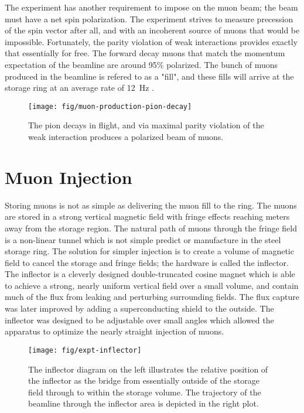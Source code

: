 The experiment has another requirement to impose on the muon beam; the beam must have a net spin polarization.  The experiment strives to measure precession of the spin vector after all, and with an incoherent source of muons that would be impossible.  Fortunately, the parity violation of weak interactions provides exactly that essentially for free.  The forward decay muons that match the momentum expectation of the beamline are around 95\% polarized.  The bunch of muons produced in the beamline is refered to as a "fill", and these fills will arrive at the storage ring at an average rate of \SI{12}{\Hz} \cite{e989-tdr}.

\begin{figure}
\label{fig:muon-production-pion-decay}
\texttt{[image: fig/muon-production-pion-decay]}
\caption{The pion decays in flight, and via maximal parity violation of the weak interaction produces a polarized beam of muons. }
\end{figure}

\section{Muon Injection} \label{sec:muon-storage}

Storing muons is not as simple as delivering the muon fill to the ring.  The muons are stored in a strong vertical magnetic field with fringe effects reaching meters away from the storage region.  The natural path of muons through the fringe field is a non-linear tunnel which is not simple predict or manufacture in the steel storage ring.  The solution for simpler injection is to create a volume of magnetic field to cancel the storage and fringe fields; the hardware is called the inflector.  The inflector is a cleverly designed double-truncated cosine magnet which is able to achieve a strong, nearly uniform vertical field over a small volume, and contain much of the flux from leaking and perturbing surrounding fields.  The flux capture was later improved by adding a superconducting shield to the outside.  The inflector was designed to be adjustable over small angles which allowed the apparatus to optimize the nearly straight injection of muons. \cite{e821-prd}

\begin{figure}
\label{fig:expt-inflector}
\texttt{[image: fig/expt-inflector]}
\caption{The inflector diagram on the left illustrates the relative position of the inflector as the bridge from essentially outside of the storage field through to within the storage volume.  The trajectory of the beamline through the inflector area is depicted in the right plot.}
\end{figure}

